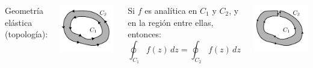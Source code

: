 \documentclass[9pt, aspectratio=169]{beamer}
\begin{document}
\begin{frame}
 \begin{columns}[t]
    \cx
    Geometría elástica (topología):
  \begin{center}
      \includegraphics[scale=0.45]{figs/fig-09.pdf}
  \end{center}

  Si $f$ es analítica en $C_1$ y $C_2$, y en la región entre ellas, entonces:
  \[ \oint_{C_1} f(z) \, dz = \oint_{C_2} f(z) \, dz \]
  \begin{center}
      \includegraphics[scale=0.45]{figs/fig-09b.pdf}
  \end{center}


\end{columns}
\end{frame}
\end{document}
